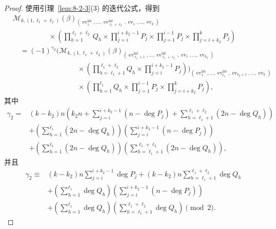 \begin{proof}
使用引理~\ref{lem:8-2-3}(3) 的迭代公式，得到
\begingroup
\small
\[
\begin{aligned}
&\mathcal M_{k,(1,\ell_1+\ell_2)}(\beta)_
{(\operatorname{ev}_1^{\mathrm{int}},\ldots,
\operatorname{ev}_{\ell_1+\ell_2}^{\mathrm{int}},
\operatorname{ev}_1,\ldots,\operatorname{ev}_k)}\\[-2pt]
&\hspace{5em}{}\times
\left(\prod_{h=1}^{\ell_1+\ell_2}Q_h
\times\prod_{j=i}^{i+k_2-1}P_j
\times\prod_{j=1}^{i-1}P_j
\times\prod_{j=i+k_2}^{k}P_j\right)\\
&\quad={}
(-1)^{\gamma_2}
\Bigg(
\mathcal M_{k,(1,\ell_1+\ell_2)}(\beta)_
{(\operatorname{ev}_{\ell_1+1}^{\mathrm{int}},\ldots,
\operatorname{ev}_{\ell_1+\ell_2}^{\mathrm{int}},
\operatorname{ev}_1,\ldots,\operatorname{ev}_{k_2})}\\[-2pt]
&\hspace{9em}{}\times
\left(\prod_{h=\ell_1+1}^{\ell_1+\ell_2}Q_h
\times\prod_{j=i}^{i+k_2-1}P_j\right)
\Bigg)_
{(\operatorname{ev}_1^{\mathrm{int}},\ldots,
\operatorname{ev}_{\ell_1}^{\mathrm{int}},
\operatorname{ev}_{k_2+1},\ldots,\operatorname{ev}_k)}\\[-2pt]
&\hspace{9em}{}\times
\left(\prod_{h=1}^{\ell_1}Q_h
\times\prod_{j=1}^{i-1}P_j
\times\prod_{j=i+k_2}^{k}P_j\right),
\end{aligned}
\]
\endgroup
其中
\[
\begin{aligned}
\gamma_2={}&(k-k_2)n\left(
k_2n+\sum_{j=i}^{i+k_2-1}(n-\deg P_j)
+\sum_{h=\ell_1+1}^{\ell_1+\ell_2}(2n-\deg Q_h)\right)\\
&+\left(\sum_{h=1}^{\ell_1}(2n-\deg Q_h)\right)
\left(\sum_{j=i}^{i+k_2-1}(n-\deg P_j)\right)\\
&+\left(\sum_{h=1}^{\ell_1}(2n-\deg Q_h)\right)
\left(\sum_{h=\ell_1+1}^{\ell_1+\ell_2}(2n-\deg Q_h)\right),
\end{aligned}
\]
并且
\[
\begin{aligned}
\gamma_2\equiv{}&
(k-k_2)n\sum_{j=i}^{i+k_2-1}\deg P_j
+(k-k_2)n\sum_{h=\ell_1+1}^{\ell_1+\ell_2}\deg Q_h\\
&+\left(\sum_{h=1}^{\ell_1}\deg Q_h\right)
 \left(\sum_{j=i}^{i+k_2-1}(n-\deg P_j)\right)\\
&+\left(\sum_{h=1}^{\ell_1}\deg Q_h\right)
 \left(\sum_{h=\ell_1+1}^{\ell_1+\ell_2}\deg Q_h\right)
\pmod2.
\end{aligned}
\]


\end{proof}
